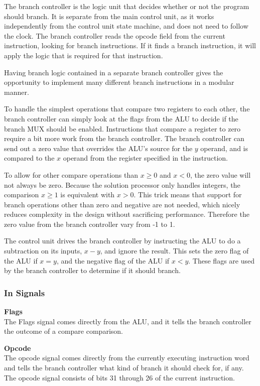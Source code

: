 The branch controller is the logic unit that decides whether or not the program should branch.
It is separate from the main control unit, as it works independently from the control unit state machine, and does not need to follow the clock.
The branch controller reads the opcode field from the current instruction, looking for branch instructions.
If it finds a branch instruction, it will apply the logic that is required for that instruction.

Having branch logic contained in a separate branch controller gives the opportunity to implement many different branch instructions in a modular manner.

To handle the simplest operations that compare two registers to each other, the branch controller can simply look at the flags from the ALU to decide if the branch MUX should be enabled.
Instructions that compare a register to zero require a bit more work from the branch controller.
The branch controller can send out a zero value that overrides the ALU's source for the $ y $ operand, and is compared to the $ x $ operand from the register specified in the instruction.

To allow for other compare operations than $x \geq 0$ and $x < 0$, the zero value will not always be zero. 
Because the solution processor only handles integers, the comparison $ x \geq 1 $ is equivalent with $ x > 0 $.
This trick means that support for branch operations other than zero and negative are not needed, which nicely reduces complexity in the design without sacrificing performance.
Therefore the zero value from the branch controller vary from -1 to 1.

The control unit drives the branch controller by instructing the ALU to do a subtraction on its inputs, $ x - y $, and ignore the result.
This sets the zero flag of the ALU if $x = y$, and the negative flag of the ALU if $x < y$.
These flags are used by the branch controller to determine if it should branch.

\subsubsection{In Signals}

\begin{description}
\item{\textbf{Flags}} \\

The Flags signal comes directly from the ALU, and it tells the branch controller the outcome of a compare comparison.

\item{\textbf{Opcode}} \\

The opcode signal comes directly from the currently executing instruction word and tells the branch controller what kind of branch it should check for, if any. The opcode signal consists of bits 31 through 26 of the current instruction.

\end{description}

